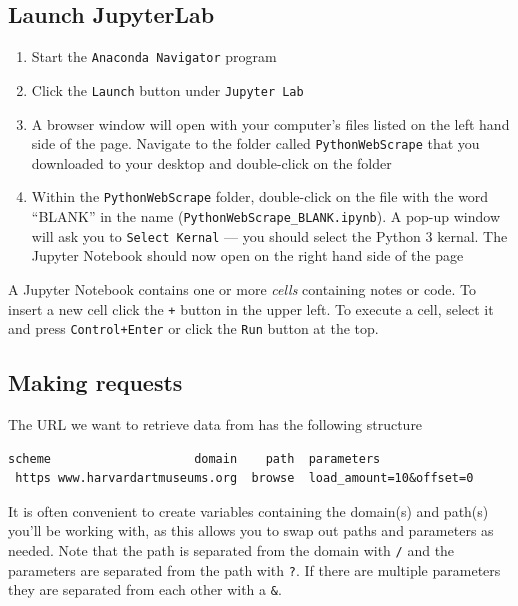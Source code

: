 \documentclass[]{book}
\providecommand{\tightlist}{%
  \setlength{\itemsep}{0pt}\setlength{\parskip}{0pt}}
\begin{document}
\subsection{Launch JupyterLab}\label{launch-jupyterlab-2}

\begin{enumerate}
\def\labelenumi{\arabic{enumi}.}
\tightlist
\item
  Start the \texttt{Anaconda\ Navigator} program
\item
  Click the \texttt{Launch} button under \texttt{Jupyter\ Lab}
\item
  A browser window will open with your computer's files listed on the
  left hand side of the page. Navigate to the folder called
  \texttt{PythonWebScrape} that you downloaded to your desktop and
  double-click on the folder
\item
  Within the \texttt{PythonWebScrape} folder, double-click on the file
  with the word ``BLANK'' in the name
  (\texttt{PythonWebScrape\_BLANK.ipynb}). A pop-up window will ask you
  to \texttt{Select\ Kernal} --- you should select the Python 3 kernal.
  The Jupyter Notebook should now open on the right hand side of the
  page
\end{enumerate}

A Jupyter Notebook contains one or more \emph{cells} containing notes or
code. To insert a new cell click the \texttt{+} button in the upper
left. To execute a cell, select it and press \texttt{Control+Enter} or
click the \texttt{Run} button at the top.

\subsection{Making requests}\label{making-requests}

The URL we want to retrieve data from has the following structure

\begin{verbatim}
scheme                    domain    path  parameters
 https www.harvardartmuseums.org  browse  load_amount=10&offset=0
\end{verbatim}

It is often convenient to create variables containing the domain(s) and
path(s) you'll be working with, as this allows you to swap out paths and
parameters as needed. Note that the path is separated from the domain
with \texttt{/} and the parameters are separated from the path with
\texttt{?}. If there are multiple parameters they are separated from
each other with a \texttt{\&}.
\end{document}
